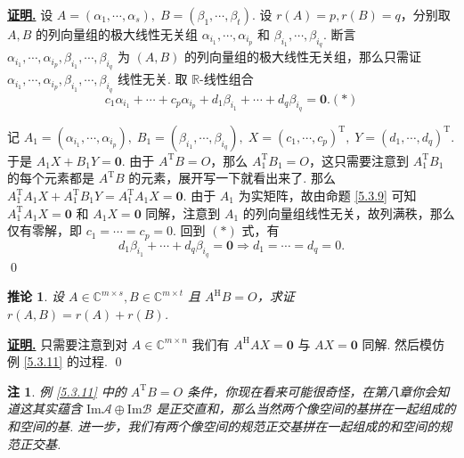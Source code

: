 \documentclass[10pt,openany]{article}
\theoremstyle{thmstyle} %
\theoremstyle{defstyle} %
\newtheorem{corollary}[theorem]{推论}
\theoremstyle{prostyle} %
\theoremstyle{exastyle}
\theoremstyle{remstyle}
\newtheorem{remark}[theorem]{注}
\renewenvironment{proof}[1][证明]{\par\underline{\textbf{#1.}} \;\fangsong}{\qed\par}
\newcommand{\T}{^{\text{T}}}
\newcommand{\Her}{^{\text{H}}}
\newcommand{\C}{\mathbb{C}}
\newcommand{\R}{\mathbb{R}}
\newcommand{\mn}{^{m \times n}}
\begin{document}
\begin{proof}
	设 \( A=(\alpha_1,\cdots,\alpha_s), \; B=(\beta_1,\cdots,\beta_t) \). 设 \( r(A)=p, r(B)=q \)，分别取 \( A,B \) 的列向量组的极大线性无关组 \( \alpha_{i_1},\cdots,\alpha_{i_p} \) 和 \( \beta_{i_1},\cdots,\beta_{i_q} \). 断言 \( \alpha_{i_1},\cdots,\alpha_{i_p}, \beta_{i_1},\cdots,\beta_{i_q} \) 为 \( (A,B) \) 的列向量组的极大线性无关组，那么只需证 \( \alpha_{i_1},\cdots,\alpha_{i_p}, \beta_{i_1},\cdots,\beta_{i_q} \) 线性无关. 取 \( \R\)-线性组合
	\[ c_1\alpha_{i_1}+\cdots+c_p\alpha_{i_p}+d_1\beta_{i_1}+\cdots+d_q\beta_{i_q}=\bm{0}.  (*) \]
	
	记 \( A_1=(\alpha_{i_1},\cdots,\alpha_{i_p}), \; B_1=(\beta_{i_1},\cdots,\beta_{i_q}), \; X=(c_1,\cdots,c_p)\T, \; Y=(d_1,\cdots,d_q)\T \). 于是 \( A_1X+B_1Y=\bm{0} \). 由于 \( A\T B=O \)，那么 \( A_1\T B_1=O \)，这只需要注意到 \( A_1\T B_1 \) 的每个元素都是 \( A\T B \) 的元素，展开写一下就看出来了. 那么 \( A_1\T A_1 X+ A_1\T B_1 Y= A_1\T A_1 X= \bm{0} \). 由于 \( A_1 \) 为实矩阵，故由命题 \ref{5.3.9} 可知 \( A_1\T A_1 X= \bm{0} \) 和 \( A_1X=\bm{0} \) 同解，注意到 \( A_1 \) 的列向量组线性无关，故列满秩，那么仅有零解，即 \( c_1=\cdots=c_p=0 \). 回到 \( (*) \) 式，有
	\[ d_1\beta_{i_1}+\cdots+d_q\beta_{i_q}=\bm{0} \Rightarrow d_1=\cdots=d_q=0. \]
\end{proof}


\begin{corollary}
	设 \( A \in \C^{m \times s}, B \in \C^{m \times t} \) 且 \( A\Her B=O \)，求证 \( r(A,B)=r(A)+r(B) \).
\end{corollary}

\begin{proof}
	只需要注意到对 \( A \in \C\mn \) 我们有 \( A\Her AX=\bm{0} \) 与 \( AX=\bm{0} \) 同解. 然后模仿例 \ref{5.3.11} 的过程.
\end{proof}


\begin{remark}
	例 \ref{5.3.11} 中的 \( A\T B=O \) 条件，你现在看来可能很奇怪，在第八章你会知道这其实蕴含 \( \text{Im}\mathscr{A} \oplus \text{Im}\mathscr{B} \) 是正交直和，那么当然两个像空间的基拼在一起组成的和空间的基. 进一步，我们有两个像空间的规范正交基拼在一起组成的和空间的规范正交基.
\end{remark}
\end{document}
